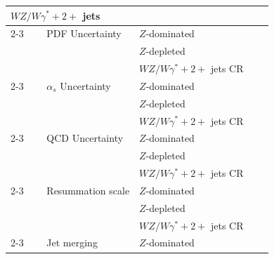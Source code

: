 \begin{table}[ht!]
{\begin{tabular}{llrl}
    \hline                                                                                             
    $WZ/W\gamma^{*}+2+$ jets & & & \\
    \cline{2-3}
    ~~~~PDF Uncertainty                                                                                & $Z$-dominated   \\
                                                                                                       & $Z$-depleted    \\
                                                                                                       & $WZ/W\gamma^{*}+2+$ jets CR\\
    \cline{2-3}                                                                                               
    ~~~~$\alpha_{s}$ Uncertainty                                                                       & $Z$-dominated   \\
                                                                                                       & $Z$-depleted    \\
                                                                                                       & $WZ/W\gamma^{*}+2+$ jets CR \\
    \cline{2-3}                                                                                               
    ~~~~QCD Uncertainty                                                                                & $Z$-dominated   \\
                                                                                                       & $Z$-depleted    \\
                                                                                                       & $WZ/W\gamma^{*}+2+$ jets CR  \\
    \cline{2-3}
    ~~~~Resummation scale                                                                              & $Z$-dominated   \\
                                                                                                       & $Z$-depleted    \\
                                                                                                       & $WZ/W\gamma^{*}+2+$ jets CR \\
    \cline{2-3}
    ~~~~Jet merging                                                                                    & $Z$-dominated   \\

\end{tabular}}
\end{table}
